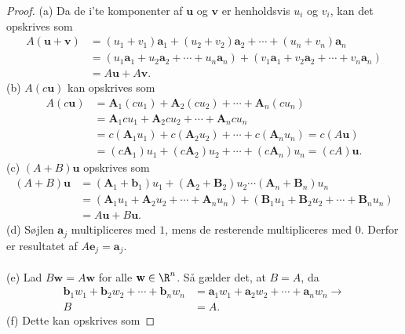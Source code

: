 \begin{proof}
(a)
Da de i'te komponenter af $\textbf{u}$ og $\textbf{v}$ er henholdsvis $u_i$ og $v_i$, kan det opskrives som
\begin{align*}
A(\mathbf{u}+\mathbf{v})&=(u_1+v_1)\mathbf{a}_1+(u_2+v_2)\mathbf{a}_2+\cdots + (u_n+v_n)\mathbf{a}_n \\
&=(u_1\mathbf{a}_1+u_2\mathbf{a}_2+\cdots+u_n\mathbf{a}_n)+(v_1\mathbf{a}_1+v_2\mathbf{a}_2+\cdots+v_n\mathbf{a}_n) \\
&=A\mathbf{u}+A\mathbf{v}.
\end{align*}
(b) $A(c\mathbf{u})$ kan opskrives som
\begin{align*}
A(c \textbf{u})&=\textbf{A}_1(cu_1)+\textbf{A}_2(cu_2) + \cdots + \textbf{A}_n(cu_n) \\
&=\textbf{A}_1cu_1+\textbf{A}_2cu_2 + \cdots + \textbf{A}_ncu_n \\
&=c(\textbf{A}_1u_1)+c(\textbf{A}_2u_2)+\cdots+c(\textbf{A}_n u_n)
=c(A \textbf{u}) \\
&=(c\textbf{A}_1)u_1+(c\textbf{A}_2)u_2+\cdots+(c\textbf{A}_n)u_n=(cA)\textbf{u}.
\end{align*}
%
(c) $(A+B)\mathbf{u}$ opskrives som
%
\begin{align*}
(A+B)\textbf{u}&=(\textbf{A}_1+\textbf{b}_1)u_1 +(\textbf{A}_2+\textbf{B}_2)u_2 \cdots (\textbf{A}_n+\textbf{B}_n)u_n \\
&=(\textbf{A}_1u_1+\textbf{A}_2u_2+ \cdots + \textbf{A}_nu_n)+(\textbf{B}_1u_1+\textbf{B}_2u_2+ \cdots + \textbf{B}_nu_n) \\
&=A\textbf{u}+B\textbf{u}.
\end{align*}
(d) 
Søjlen $\mathbf{a}_j$ multipliceres med $1$, mens de resterende multipliceres med $0$. 
Derfor er resultatet af $A\mathbf{e}_j=\mathbf{a}_j.$
\\\\
(e) Lad  $B\mathbf{w}=A\mathbf{w}$ for alle $\mathbf{w} \in \R^n$.
Så gælder det, at $B=A$, da
%
\begin{align*}
\textbf{b}_1w_1+\textbf{b}_2 w_2+\cdots+\textbf{b}_n w_n &=\textbf{a}_1 w_1+\textbf{a}_2 w_2+\cdots+\textbf{a}_n w_n \rightarrow\\   
B&=A.
\end{align*}
(f)
Dette kan opskrives som

\end{proof}
